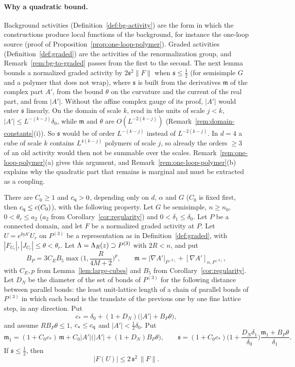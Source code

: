 \paragraph{Why a quadratic bound.} Background activities (Definition~\ref{def:bg-activity}) are the form in which the constructions produce local functions of the background, for instance the one-loop source (proof of Proposition~\ref{prop:one-loop-polymer}). Graded activities (Definition~\ref{def:graded}) are the activities of the renormalization group, and Remark~\ref{rem:bg-to-graded} passes from the first to the second. The next lemma bounds a normalized graded activity by $2\mathfrak s^2\|F\|$ when $\mathfrak s\le\frac12$ (for semisimple $G$ and a polymer that does not wrap), where $\mathfrak s$ is built from the derivatives $\mathfrak m$ of the complex part $A'$, from the bound $\theta$ on the curvature and the current of the real part, and from $|A'|$. Without the affine complex gauge of its proof, $|A'|$ would enter $\mathfrak s$ linearly. On the domain of scale $k$, read in the units of scale $j<k$, $|A'|\le L^{-(k-j)}\delta_0$, while $\mathfrak m$ and $\theta$ are $O(L^{-2(k-j)})$ (Remark~\ref{rem:domain-constants}(i)). So $\mathfrak s$ would be of order $L^{-(k-j)}$ instead of $L^{-2(k-j)}$. In $d=4$ a cube of scale $k$ contains $L^{4(k-j)}$ polymers of scale $j$, so already the orders $\ge3$ of an old activity would then not be summable over the scales. Remark~\ref{rem:one-loop-polymer}(a) gives this argument, and Remark~\ref{rem:one-loop-polymer}(b) explains why the quadratic part that remains is marginal and must be extracted as a coupling.

\begin{lemma}\label{lem:quadratic-bound}
There are $C_0\ge1$ and $c_{\rm q}>0$, depending only on $d$, $\alpha$ and $G$ ($C_0$ is fixed first, then $c_{\rm q}\le c(C_0)$), with the following property. Let $G$ be semisimple, $n\ge n_0$, $0<\theta_r\le a_2$ ($a_2$ from Corollary~\ref{cor:regularity}) and $0<\delta_1\le\delta_0$. Let $P$ be a connected domain, and let $F$ be a normalized graded activity at $P$. Let $U=e^{\ii\eta A'}U_r$ on $P^{(3)}$ be a representation as in Definition~\ref{def:graded}, with $|F_{U_r}|,|J_{U_r}|\le\theta<\theta_r$. Let $\Lambda=\Lambda_R(z)\supset P^{(3)}$ with $2R<n$, and put
\[
B_P=3C_EB_5\max\Big(1,\frac R{4M+2}\Big)^p,\qquad\mathfrak m=|\nabla A'|_{P^{(3)}}+[\nabla A']_{\alpha,P^{(3)}},
\]
with $C_E,p$ from Lemma~\ref{lem:large-cubes} and $B_5$ from Corollary~\ref{cor:regularity}. Let $D_N$ be the diameter of the set of bonds of $P^{(3)}$ for the following distance between parallel bonds: the least unit-lattice length of a chain of parallel bonds of $P^{(3)}$ in which each bond is the translate of the previous one by one fine lattice step, in any direction. Put
\[
c_*=\delta_0+(1+D_N)\big(|A'|+B_P\theta\big),
\]
and assume $RB_P\theta\le1$, $c_*\le c_{\rm q}$ and $|A'|<\frac12\delta_0$. Put
\[
\mathfrak m_1=(1+C_0c_*)\,\mathfrak m+C_0|A'|\big(|A'|+(1+D_N)B_P\theta\big),\qquad\mathfrak s=(1+C_0c_*)\Big(1+\frac{D_N\delta_1}{\delta_0}\Big)\frac{\mathfrak m_1+B_P\theta}{\delta_1}.
\]
If $\mathfrak s\le\frac12$, then
\[
|F(U)|\le2\,\mathfrak s^2\,\|F\| .
\]
\end{lemma}


